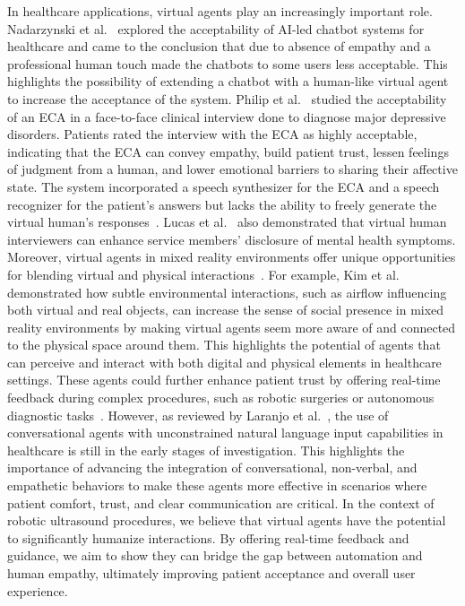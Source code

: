  In healthcare applications, virtual agents play an increasingly important role. Nadarzynski et al.~\cite{nadarzynski2019acceptability} explored the acceptability of AI-led chatbot systems for healthcare and came to the conclusion that due to absence of empathy and a professional human touch made the chatbots to some users less acceptable. This highlights the possibility of extending a chatbot with a human-like virtual agent to increase the acceptance of the system. Philip et al.~\cite{philip2017virtual} studied the acceptability of an ECA in a face-to-face clinical interview done to diagnose major depressive disorders. Patients rated the interview with the ECA as highly acceptable, indicating that the ECA can convey empathy, build patient trust, lessen feelings of judgment from a human, and lower emotional barriers to sharing their affective state. The system incorporated a speech synthesizer for the ECA and a speech recognizer for the patient's answers but lacks the ability to freely generate the virtual human's responses~\cite{philip2014could}. Lucas et al.~\cite{lucas2017reporting} also demonstrated that virtual human interviewers can enhance service members' disclosure of mental health symptoms. Moreover, virtual agents in mixed reality environments offer unique opportunities for blending virtual and physical interactions~\cite{holz2011mira,norouzi2020systematic}. For example, Kim et al.~\cite{kim2019blowing} demonstrated how subtle environmental interactions, such as airflow influencing both virtual and real objects, can increase the sense of social presence in mixed reality environments by making virtual agents seem more aware of and connected to the physical space around them. This highlights the potential of agents that can perceive and interact with both digital and physical elements in healthcare settings. These agents could further enhance patient trust by offering real-time feedback during complex procedures, such as robotic surgeries or autonomous diagnostic tasks~\cite{juravle2020trust}.
However, as reviewed by Laranjo et al.~\cite{laranjo2018conversational}, the use of conversational agents  with unconstrained natural language input capabilities in healthcare is still in the early stages of investigation. This highlights the importance of advancing the integration of conversational, non-verbal, and empathetic behaviors to make these agents more effective in scenarios where patient comfort, trust, and clear communication are critical. In the context of robotic ultrasound procedures, we believe that virtual agents have the potential to significantly humanize interactions. By offering real-time feedback and guidance, we aim to show they can bridge the gap between automation and human empathy, ultimately improving patient acceptance and overall user experience.


